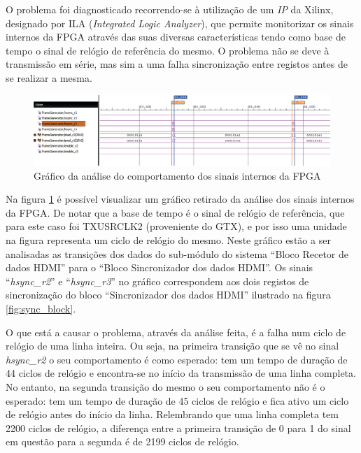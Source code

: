 \documentclass[11pt,a4paper]{article}
\begin{document}
	O problema foi diagnosticado recorrendo-se à utilização de um \textit{IP} da Xilinx, designado por ILA (\textit{Integrated Logic Analyzer}), que permite monitorizar os sinais internos da FPGA através das suas diversas características tendo como base de tempo o sinal de relógio de referência do mesmo. O problema não se deve à transmissão em série, mas sim a uma falha sincronização entre registos antes de se realizar a mesma.
	
	\begin{figure}
		\begin{center}
			\leavevmode
			\includegraphics[width=1.0\textwidth]{erro_planoE}
			\caption[Gráfico da análise do comportamento dos sinais internos da FPGA]{Gráfico da análise do comportamento dos sinais internos da FPGA}
			\label{fig:planoE_rerro}
		\end{center}
	\end{figure}
	
	Na figura \ref{fig:planoE_rerro} é possível visualizar um gráfico retirado da análise dos sinais internos da FPGA. De notar que a base de tempo é o sinal de relógio de referência, que para este caso foi TXUSRCLK2 (proveniente do GTX), e por isso uma unidade na figura representa um ciclo de relógio do mesmo.  Neste gráfico estão a ser analisadas as transições dos dados do sub-módulo do sistema ``Bloco Recetor de dados HDMI'' para o ``Bloco Sincronizador dos dados HDMI''. Os sinais ``\textit{hsync\_r2}'' e ``\textit{hsync\_r3}'' no gráfico correspondem aos dois registos de sincronização do bloco ``Sincronizador dos dados HDMI'' ilustrado na figura \ref{fig:sync_block}.
	
	O que está a causar o problema, através da análise feita, é a falha num ciclo de relógio de uma linha inteira. Ou seja, na primeira transição que se vê no sinal \textit{hsync\_r2} o seu comportamento é como esperado: tem um tempo de duração de 44 ciclos de relógio e encontra-se no início da transmissão de uma linha completa. No entanto, na segunda transição do mesmo o seu comportamento não é o esperado: tem um tempo de duração de 45 ciclos de relógio e fica ativo um ciclo de relógio antes do início da linha. Relembrando que uma linha completa tem 2200 ciclos de relógio, a diferença entre a primeira transição de 0 para 1 do sinal em questão para a segunda é de 2199 ciclos de relógio. 
	
\end{document}
